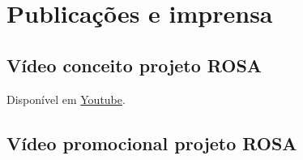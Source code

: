 \documentclass[a4paper,11pt,oneside,brazilian,
draft=false]{report}%
\newcommand*{\standardchapterstyle}{%
  \titleformat{\chapter}[display]
  {\normalfont\huge\bfseries}{\chaptertitlename\ \thechapter}{20pt}{\Huge}
  \titlespacing*{\chapter}{0pt}{50pt}{40pt}
}
\begin{document}

\chapter{Publicações e imprensa}





\section{Vídeo conceito projeto ROSA}
Disponível em \href{https://youtu.be/Cw6f-8JNUK0}{Youtube}.


\section{Vídeo promocional projeto ROSA} 

%

\standardchapterstyle   
\end{document}
